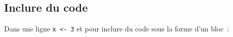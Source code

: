\subsection*{Inclure du code}\label{inclure-du-code}

Dans une ligne \texttt{x\ \textless{}-\ 3} et pour inclure du code sous
la forme d'un bloc~:

\begin{Shaded}
\begin{Highlighting}[]
\NormalTok{:}\NormalTok{)\{}
\NormalTok{\}}
\end{Highlighting}
\end{Shaded}

\begin{Shaded}
\begin{Highlighting}[]
      \KeywordTok{;} 
\end{Highlighting}
\end{Shaded}

